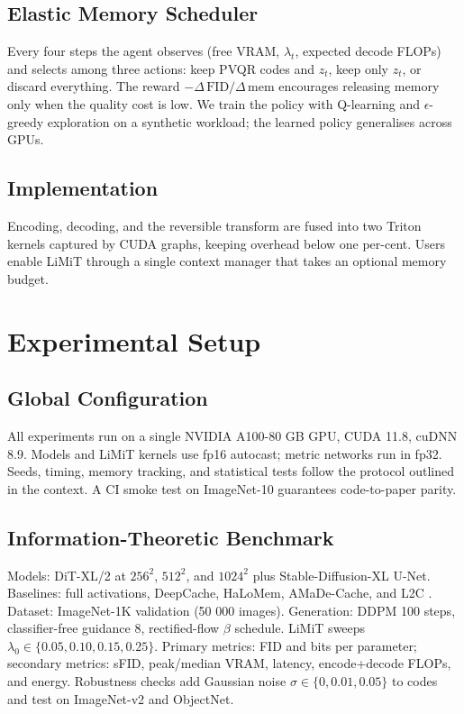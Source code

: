 \documentclass{article}
\begin{document}
\subsection{Elastic Memory Scheduler}
Every four steps the agent observes (free VRAM, $\lambda_t$, expected decode FLOPs) and selects among three actions: keep PVQR codes and $z_t$, keep only $z_t$, or discard everything. The reward $-\Delta\,\mathrm{FID}/\Delta\,\mathrm{mem}$ encourages releasing memory only when the quality cost is low. We train the policy with Q-learning and $\epsilon$-greedy exploration on a synthetic workload; the learned policy generalises across GPUs.

\subsection{Implementation}
Encoding, decoding, and the reversible transform are fused into two Triton kernels captured by CUDA graphs, keeping overhead below one per-cent. Users enable LiMiT through a single context manager that takes an optional memory budget.

\section{Experimental Setup}
\subsection{Global Configuration}
All experiments run on a single NVIDIA A100-80 GB GPU, CUDA 11.8, cuDNN 8.9. Models and LiMiT kernels use fp16 autocast; metric networks run in fp32. Seeds, timing, memory tracking, and statistical tests follow the protocol outlined in the context. A CI smoke test on ImageNet-10 guarantees code-to-paper parity.

\subsection{Information-Theoretic Benchmark}
Models: DiT-XL/2 at $256^2$, $512^2$, and $1024^2$ plus Stable-Diffusion-XL U-Net. Baselines: full activations, DeepCache, HaLoMem, AMaDe-Cache, and L2C \cite{ma-2024-learning}. Dataset: ImageNet-1K validation (50 000 images). Generation: DDPM 100 steps, classifier-free guidance 8, rectified-flow $\beta$ schedule. LiMiT sweeps $\lambda_0 \in \{0.05, 0.10, 0.15, 0.25\}$. Primary metrics: FID and bits per parameter; secondary metrics: sFID, peak/median VRAM, latency, encode+decode FLOPs, and energy. Robustness checks add Gaussian noise $\sigma \in \{0, 0.01, 0.05\}$ to codes and test on ImageNet-v2 and ObjectNet.
\end{document}
